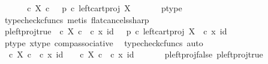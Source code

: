 \begin{isabellebody}
\ \ \isamarkupfalse%
\ \isamarkupfalse%
\ {\isachardoublequoteopen}{\isasymt}\ {\isasymcirc}\isactrlsub c\ {\isasymbeta}\isactrlbsub X\ {\isasymtimes}\isactrlsub c\ {\isasymone}\isactrlesub \ {\isacharequal}{\kern0pt}\ p\ {\isasymcirc}\isactrlsub c\ left{\isacharunderscore}{\kern0pt}cart{\isacharunderscore}{\kern0pt}proj\ X\ {\isasymone}{\isachardoublequoteclose}\isanewline
\ \ \ \ \isamarkupfalse%
\ p{\isacharunderscore}{\kern0pt}type\ \isamarkupfalse%
\ {\isacharparenleft}{\kern0pt}typecheck{\isacharunderscore}{\kern0pt}cfuncs{\isacharcomma}{\kern0pt}\ metis\ flat{\isacharunderscore}{\kern0pt}cancels{\isacharunderscore}{\kern0pt}sharp{\isacharparenright}{\kern0pt}\isanewline
\ \ \isamarkupfalse%
\ \isamarkupfalse%
\ p{\isacharunderscore}{\kern0pt}left{\isacharunderscore}{\kern0pt}proj{\isacharunderscore}{\kern0pt}true{\isacharcolon}{\kern0pt}\ {\isachardoublequoteopen}{\isasymt}\ {\isasymcirc}\isactrlsub c\ {\isasymbeta}\isactrlbsub X\ {\isasymtimes}\isactrlsub c\ {\isasymone}\isactrlesub \ {\isasymcirc}\isactrlsub c\ {\isasymlangle}x{\isacharcomma}{\kern0pt}\ id\ {\isasymone}{\isasymrangle}\ {\isacharequal}{\kern0pt}\ p\ {\isasymcirc}\isactrlsub c\ left{\isacharunderscore}{\kern0pt}cart{\isacharunderscore}{\kern0pt}proj\ X\ {\isasymone}\ {\isasymcirc}\isactrlsub c\ {\isasymlangle}x{\isacharcomma}{\kern0pt}\ id\ {\isasymone}{\isasymrangle}{\isachardoublequoteclose}\isanewline
\ \ \ \ \isamarkupfalse%
\ p{\isacharunderscore}{\kern0pt}type\ x{\isacharunderscore}{\kern0pt}type\ comp{\isacharunderscore}{\kern0pt}associative{}\ \isamarkupfalse%
\ {\isacharparenleft}{\kern0pt}typecheck{\isacharunderscore}{\kern0pt}cfuncs{\isacharcomma}{\kern0pt}\ auto{\isacharparenright}{\kern0pt}\isanewline
\isanewline
\ \ \isamarkupfalse%
\ {\isachardoublequoteopen}{\isasymt}\ {\isasymcirc}\isactrlsub c\ {\isasymbeta}\isactrlbsub X\ {\isasymtimes}\isactrlsub c\ {\isasymone}\isactrlesub \ {\isasymcirc}\isactrlsub c\ {\isasymlangle}x{\isacharcomma}{\kern0pt}\ id\ {\isasymone}{\isasymrangle}\ {\isacharequal}{\kern0pt}\ {\isasymf}\ {\isasymcirc}\isactrlsub c\ {\isasymbeta}\isactrlbsub X\ {\isasymtimes}\isactrlsub c\ {\isasymone}\isactrlesub \ {\isasymcirc}\isactrlsub c\ {\isasymlangle}x{\isacharcomma}{\kern0pt}\ id\ {\isasymone}{\isasymrangle}{\isachardoublequoteclose}\isanewline
\ \ \ \ \isamarkupfalse%
\ p{\isacharunderscore}{\kern0pt}left{\isacharunderscore}{\kern0pt}proj{\isacharunderscore}{\kern0pt}false\ p{\isacharunderscore}{\kern0pt}left{\isacharunderscore}{\kern0pt}proj{\isacharunderscore}{\kern0pt}true\ \isamarkupfalse%

\end{isabellebody}
